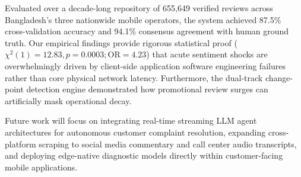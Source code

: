 \documentclass[review,12pt,authoryear]{elsarticle}
\begin{document}
Evaluated over a decade-long repository of 655,649 verified reviews across Bangladesh's three nationwide mobile operators, the system achieved 87.5\% cross-validation accuracy and 94.1\% consensus agreement with human ground truth. Our empirical findings provide rigorous statistical proof ($\chi^2(1) = 12.83, p = 0.0003; \text{OR} = 4.23$) that acute sentiment shocks are overwhelmingly driven by client-side application software engineering failures rather than core physical network latency. Furthermore, the dual-track change-point detection engine demonstrated how promotional review surges can artificially mask operational decay.

Future work will focus on integrating real-time streaming LLM agent architectures for autonomous customer complaint resolution, expanding cross-platform scraping to social media commentary and call center audio transcripts, and deploying edge-native diagnostic models directly within customer-facing mobile applications.



\end{document}
